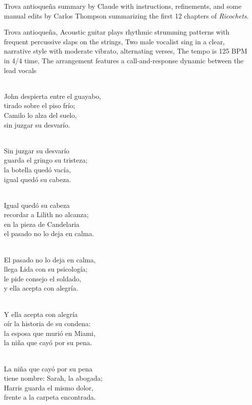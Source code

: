
\begin{notes}
Trova antioqueña summary by Claude with instructions, refinements, and some manual edits by Carlos Thompson %
summarizing the first 12 chapters of \emph{Ricochets}.
\end{notes}
\begin{style}
Trova antioqueña, Acoustic guitar plays rhythmic strumming patterns with frequent percussive slaps on the strings, Two male vocalist sing in a clear, narrative style with moderate vibrato, alternating verses, The tempo is 125 BPM in 4/4 time, The arrangement features a call-and-response dynamic between the lead vocals
\end{style}
\begin{lyrics}
\\
John despierta entre el guayabo,\\
tirado sobre el piso frío;\\
Camilo lo alza del suelo,\\
sin juzgar su desvarío.

\\
Sin juzgar su desvarío\\
guarda el gringo su tristeza;\\
la botella quedó vacía,\\
igual quedó su cabeza.

\\
Igual quedó su cabeza\\
recordar a Lilith no alcanza;\\
en la pieza de Candelaria\\
el pasado no lo deja en calma.

\\
El pasado no lo deja en calma,\\
llega Lida con su psicología;\\
le pide consejo el soldado,\\
y ella acepta con alegría.

\\
Y ella acepta con alegría\\
oír la historia de su condena:\\
la esposa que murió en Miami,\\
la niña que cayó por su pena.

\\
La niña que cayó por su pena\\
tiene nombre: Sarah, la abogada;\\
Harris guarda el mismo dolor,\\
frente a la carpeta encontrada.


\end{lyrics}
